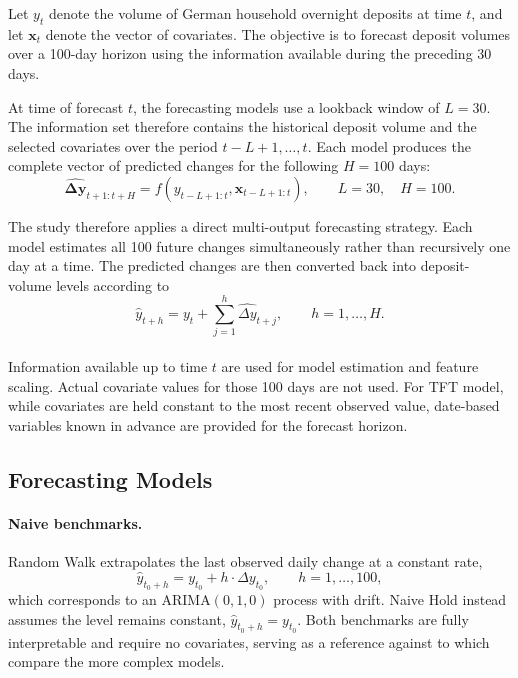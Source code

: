 \documentclass[11pt,a4paper]{article}
\begin{document}
Let \(y_t\) denote the volume of German household overnight deposits at time
\(t\), and let \(\mathbf{x}_t\) denote the vector of covariates. The objective is to forecast deposit volumes over a
100-day horizon using the information available during the preceding 30 days.

At time of forecast \(t\), the forecasting models use a lookback window of \(L=30\). The information set therefore contains the historical deposit
volume and the selected covariates over the period
\(t-L+1,\ldots,t\). Each model produces the complete vector of predicted
changes for the following \(H=100\) days:
\begin{equation}
    \widehat{\boldsymbol{\Delta y}}_{t+1:t+H}
    =
    f\!\left(
        y_{t-L+1:t},
        \mathbf{x}_{t-L+1:t}
    \right),
    \qquad L=30,\quad H=100.
    \label{eq:forecasting_problem}
\end{equation}

The study therefore applies a direct multi-output forecasting strategy. Each model estimates
all 100 future changes simultaneously rather than recursively one day at a time. The predicted changes are then
converted back into deposit-volume levels according to
\begin{equation*}
    \widehat{y}_{t+h}
    =
    y_t+
    \sum_{j=1}^{h}
    \widehat{\Delta y}_{t+j},
    \qquad h=1,\ldots,H.
    \label{eq:level_reconstruction}
\end{equation*}
\\
\indent Information available up to time $t$ are used
for model estimation and feature scaling. Actual covariate values for those 100 days are not used. For TFT model, while covariates are held constant to the most recent observed value, date-based variables known in advance are provided for the forecast horizon. 

\subsection{Forecasting Models}

\paragraph{Naive benchmarks.}
Random Walk extrapolates the last observed daily change at a constant
rate,
\begin{equation*}
    \hat{y}_{t_0+h} = y_{t_0} + h \cdot \Delta y_{t_0}, \qquad h = 1, \dots, 100,
    \label{eq:naive_rw}
\end{equation*}
which corresponds to an ARIMA$(0,1,0)$ process with drift. Naive Hold instead assumes the level
remains constant, $\hat{y}_{t_0+h} = y_{t_0}$. Both benchmarks are
fully interpretable and require no covariates, serving as a reference against to which compare the more complex models.
\end{document}
